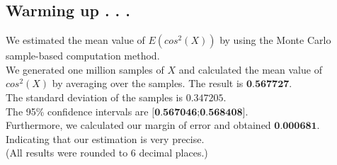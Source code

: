 \subsection{Warming up . . .}
We estimated the mean value of $E(cos^2(X))$ by using the Monte Carlo sample-based computation method.\\
We generated one million samples of $X$ and calculated the mean value of $cos^2(X)$ by averaging over the samples.
The result is $\textbf{0.567727}$.\\
The standard deviation of the samples is $0.347205$.\\
The 95\% confidence intervals are
$\textbf{[0.567046;0.568408]}$.\\

Furthermore, we calculated our margin of error and obtained $\textbf{0.000681}$. Indicating that our estimation is very
precise.\\
(All results were rounded to 6 decimal places.)
